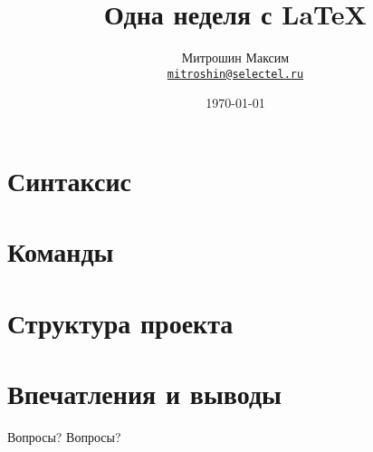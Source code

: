 \documentclass[10pt]{beamer}
\title{Одна неделя с \LaTeX}
\author[Митрошин Максим]{Митрошин Максим \\ \texttt{\href{mailto:mitroshin@selectel.ru}{mitroshin@selectel.ru}}}
\date{\today}
\institute{Selectel}
\begin{document}
\begin{frame}
\titlepage
\end{frame}

\section{Синтаксис}


\section{Команды}



\section{Структура проекта}

% 
% 

\section{Впечатления и выводы}


\begin{frame}{Вопросы?}
  Вопросы?
\end{frame}
\end{document}
